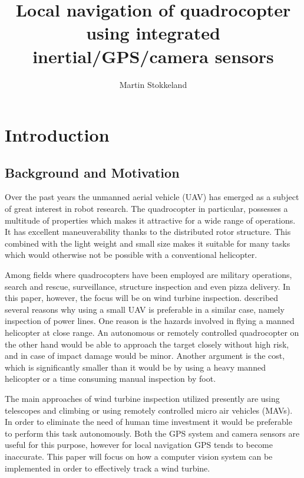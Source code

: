 \documentclass[a4paper,10pt]{article}
\title{Local navigation of quadrocopter using integrated inertial/GPS/camera sensors}
\author{Martin Stokkeland}
\begin{document}
\maketitle

\newpage

\begin{abstract}
\end{abstract}

\tableofcontents

\section{Introduction}
  \subsection{Background and Motivation}
  Over the past years the unmanned aerial vehicle (UAV) has emerged as a subject of great interest in robot research. The quadrocopter in particular, possesses a multitude of properties which makes it attractive for a wide range of operations. It has excellent maneuverability thanks to the distributed rotor structure. This combined with the light weight and small size makes it suitable for many tasks which would otherwise not be possible with a conventional helicopter. 
  
  Among fields where quadrocopters have been employed are military operations, search and rescue, surveillance,  structure inspection and even pizza delivery. In this paper, however, the focus will be on wind turbine inspection. \citet{williams01} described several reasons why using a small UAV is preferable in a similar case, namely inspection of power lines. One reason is the hazards involved in flying a manned helicopter at close range. An autonomous or remotely controlled quadrocopter on the other hand would be able to approach the target closely without high risk, and in case of impact damage would be minor. Another argument is the cost, which is significantly smaller than it would be by using a heavy manned helicopter or a time consuming manual inspection by foot.
  
  The main approaches of wind turbine inspection utilized presently are using telescopes and climbing or using remotely controlled micro air vehicles (MAVs). In order to eliminate the need of human time investment it would be preferable to perform this task autonomously. Both the GPS system and camera sensors are useful for this purpose, however for local navigation GPS tends to become inaccurate. This paper will focus on how a computer vision system can be implemented in order to effectively track a wind turbine.
    
\end{document}
